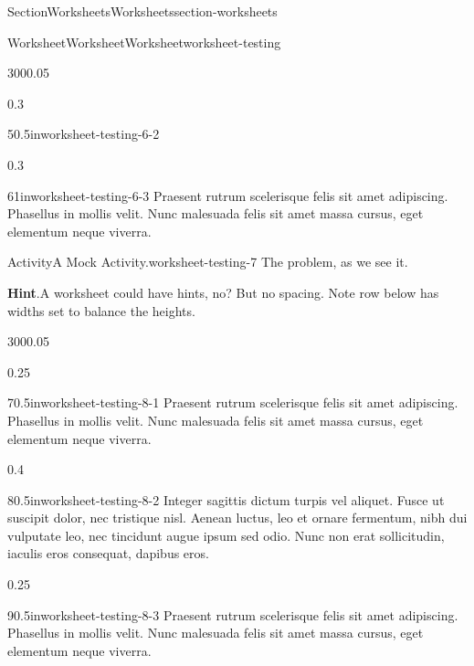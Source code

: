 \documentclass[twoside,10pt,]{article}
\newcommand{\blocktitlefont}{\relax}
\numberwithin{equation}{section}
\begin{document}
\begin{sectionptx}{Section}{Worksheets}{}{Worksheets}{}{}{section-worksheets}
\begin{worksheet-subsection}{Worksheet}{Worksheet}{}{Worksheet}{}{}{worksheet-testing}
\begin{sidebyside}{3}{0}{0}{0.05}
\begin{sbspanel}{0.3}
\begin{divisionexercise}{5}{}{0.5in}{worksheet-testing-6-2}
\end{divisionexercise}%
\end{sbspanel}%
\begin{sbspanel}{0.3}%
\begin{divisionexercise}{6}{}{1in}{worksheet-testing-6-3}%
Praesent rutrum scelerisque felis sit amet adipiscing. Phasellus in mollis velit. Nunc malesuada felis sit amet massa cursus, eget elementum neque viverra.%
\end{divisionexercise}%
\end{sbspanel}%
\end{sidebyside}%
\begin{activity}{Activity}{A Mock Activity.}{worksheet-testing-7}%
The problem, as we see it.%
\par\smallskip%
\noindent\textbf{\blocktitlefont Hint}.\hypertarget{worksheet-testing-7-3}{}\quad{}A worksheet could have hints, no?  But no spacing. Note row below has widths set to balance the heights.%
\end{activity}%
\begin{sidebyside}{3}{0}{0}{0.05}%
\begin{sbspanel}{0.25}%
\begin{divisionexercise}{7}{}{0.5in}{worksheet-testing-8-1}%
Praesent rutrum scelerisque felis sit amet adipiscing. Phasellus in mollis velit. Nunc malesuada felis sit amet massa cursus, eget elementum neque viverra.%
\end{divisionexercise}%
\end{sbspanel}%
\begin{sbspanel}{0.4}%
\begin{divisionexercise}{8}{}{0.5in}{worksheet-testing-8-2}%
Integer sagittis dictum turpis vel aliquet. Fusce ut suscipit dolor, nec tristique nisl. Aenean luctus, leo et ornare fermentum, nibh dui vulputate leo, nec tincidunt augue ipsum sed odio. Nunc non erat sollicitudin, iaculis eros consequat, dapibus eros.%
\end{divisionexercise}%
\end{sbspanel}%
\begin{sbspanel}{0.25}%
\begin{divisionexercise}{9}{}{0.5in}{worksheet-testing-8-3}%
Praesent rutrum scelerisque felis sit amet adipiscing. Phasellus in mollis velit. Nunc malesuada felis sit amet massa cursus, eget elementum neque viverra.%
\end{divisionexercise}%
\end{sbspanel}%
\end{sidebyside}%

\end{worksheet-subsection}
\end{sectionptx}
\end{document}
